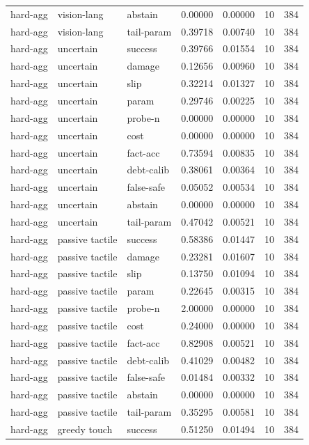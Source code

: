 \documentclass{article}
\begin{document}
\begin{center}
\begin{longtable}{lllllll}
hard-agg & vision-lang & abstain & 0.00000 & 0.00000 & 10 & 384 \\
hard-agg & vision-lang & tail-param & 0.39718 & 0.00740 & 10 & 384 \\
hard-agg & uncertain & success & 0.39766 & 0.01554 & 10 & 384 \\
hard-agg & uncertain & damage & 0.12656 & 0.00960 & 10 & 384 \\
hard-agg & uncertain & slip & 0.32214 & 0.01327 & 10 & 384 \\
hard-agg & uncertain & param & 0.29746 & 0.00225 & 10 & 384 \\
hard-agg & uncertain & probe-n & 0.00000 & 0.00000 & 10 & 384 \\
hard-agg & uncertain & cost & 0.00000 & 0.00000 & 10 & 384 \\
hard-agg & uncertain & fact-acc & 0.73594 & 0.00835 & 10 & 384 \\
hard-agg & uncertain & debt-calib & 0.38061 & 0.00364 & 10 & 384 \\
hard-agg & uncertain & false-safe & 0.05052 & 0.00534 & 10 & 384 \\
hard-agg & uncertain & abstain & 0.00000 & 0.00000 & 10 & 384 \\
hard-agg & uncertain & tail-param & 0.47042 & 0.00521 & 10 & 384 \\
hard-agg & passive tactile & success & 0.58386 & 0.01447 & 10 & 384 \\
hard-agg & passive tactile & damage & 0.23281 & 0.01607 & 10 & 384 \\
hard-agg & passive tactile & slip & 0.13750 & 0.01094 & 10 & 384 \\
hard-agg & passive tactile & param & 0.22645 & 0.00315 & 10 & 384 \\
hard-agg & passive tactile & probe-n & 2.00000 & 0.00000 & 10 & 384 \\
hard-agg & passive tactile & cost & 0.24000 & 0.00000 & 10 & 384 \\
hard-agg & passive tactile & fact-acc & 0.82908 & 0.00521 & 10 & 384 \\
hard-agg & passive tactile & debt-calib & 0.41029 & 0.00482 & 10 & 384 \\
hard-agg & passive tactile & false-safe & 0.01484 & 0.00332 & 10 & 384 \\
hard-agg & passive tactile & abstain & 0.00000 & 0.00000 & 10 & 384 \\
hard-agg & passive tactile & tail-param & 0.35295 & 0.00581 & 10 & 384 \\
hard-agg & greedy touch & success & 0.51250 & 0.01494 & 10 & 384 \\

\end{longtable}
\end{center}
\end{document}
